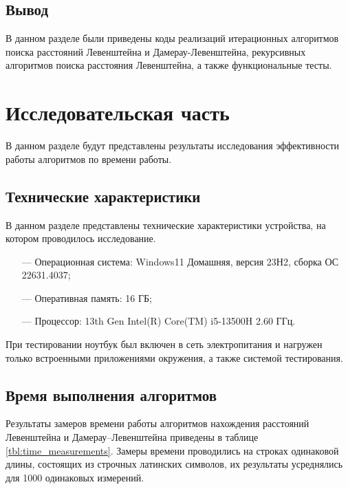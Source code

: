 \documentclass[a4paper,14pt, unknownkeysallowed]{extreport}
\begin{document}
\section*{Вывод}
В данном разделе были приведены коды реализаций итерационных алгоритмов поиска расстояний Левенштейна и Дамерау-Левенштейна, рекурсивных алгоритмов поиска расстояния Левенштейна, а также функциональные тесты.



\chapter{Исследовательская часть}
В данном разделе будут представлены результаты исследования эффективности работы алгоритмов по времени работы.

\section{Технические характеристики}

В данном разделе представлены технические характеристики устройства, на котором проводилось исследование.

\begin{itemize}
    \item[---] Операционная система: Windows11 Домашняя, версия 23Н2, сборка ОС 22631.4037;
    \item[---] Оперативная память: 16 ГБ;
    \item[---] Процессор: 13th Gen Intel(R) Core(TM) i5-13500H   2.60 ГГц.
\end{itemize}

При тестировании ноутбук был включен в сеть электропитания и нагружен только встроенными приложениями окружения, а также системой тестирования.

\section{Время выполнения алгоритмов}

Результаты замеров времени работы алгоритмов нахождения расстояний Левенштейна и Дамерау–Левенштейна приведены в таблице \ref{tbl:time_measurements}. Замеры времени проводились на строках одинаковой длины, состоящих из строчных латинских символов, их результаты усреднялись для 1000 одинаковых измерений.
\end{document}
